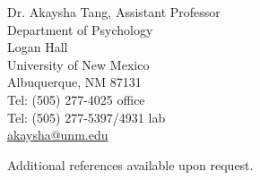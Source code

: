 \documentclass[10pt,overlapped,line]{res}
\begin{document}
\begin{resume}
\begin{multicols}{2}
{   Dr. Akaysha Tang, Assistant Professor\\
   Department of Psychology \\
   Logan Hall \\
   University of New Mexico \\
   Albuquerque, NM 87131 \\
   Tel: (505) 277-4025 office \\
   Tel: (505) 277-5397/4931 lab \\
   \href{URL}{akaysha@unm.edu} \\
}
\end{multicols}

Additional references available upon request.



\end{resume}
\end{document}
